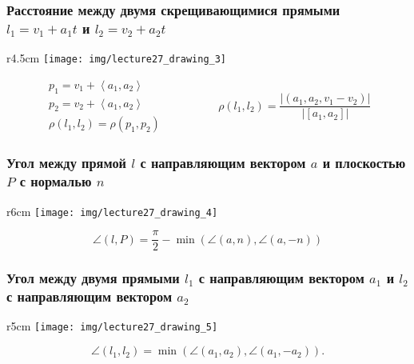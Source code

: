 \subsubsection{Расстояние между двумя скрещивающимися прямыми $l_1 = v_1 + a_1 t$ и $l_2 = v_2 + a_2 t$}

{
\begin{wrapfigure}{r}{4.5cm}
    \vspace{-10pt}
    \texttt{[image: img/lecture27\_drawing\_3]}
\end{wrapfigure}

\begin{equation*}
    \begin{gathered}
        p_1 = v_1 + \left< a_1, a_2 \right> \\
        p_2 = v_2 + \left< a_1, a_2 \right> \\
        \rho(l_1, l_2) = \rho(p_1, p_2)
    \end{gathered}
    \hspace{2cm}
    \rho(l_1, l_2) = \frac{\left|(a_1, a_2, v_1 - v_2)\right|}{\left|[a_1, a_2]\right|}
\end{equation*}
\vspace{1.5cm}
}


\subsubsection{Угол между прямой $l$ с направляющим вектором $a$ и плоскостью $P$ с нормалью $n$}

{
\begin{wrapfigure}{r}{6cm}
    \vspace{-10pt}
    \texttt{[image: img/lecture27\_drawing\_4]}
\end{wrapfigure}

\begin{equation*}
    \angle(l, P) = \frac{\pi}{2} - \min\left(\angle(a, n), \angle(a, -n)\right)
\end{equation*}
\vspace{0.5cm}
}


\subsubsection{Угол между двумя прямыми $l_1$ с направляющим вектором $a_1$ и $l_2$ с направляющим вектором $a_2$}

{
\begin{wrapfigure}{r}{5cm}
    \vspace{-10pt}
    \texttt{[image: img/lecture27\_drawing\_5]}
\end{wrapfigure}

\begin{equation*}
    \angle (l_1, l_2) = \min(\angle(a_1, a_2), \angle(a_1, -a_2))
.\end{equation*}
}

